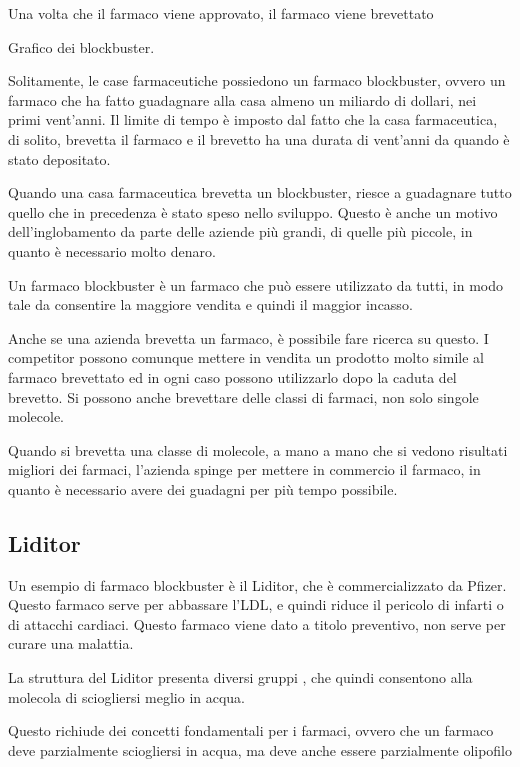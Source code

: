 Una volta che il farmaco viene approvato, il farmaco viene brevettato

Grafico dei blockbuster.

Solitamente, le case farmaceutiche possiedono un farmaco blockbuster,
ovvero un farmaco che ha fatto guadagnare alla casa almeno un miliardo
di dollari, nei primi vent'anni. Il limite di tempo è imposto dal fatto
che la casa farmaceutica, di solito, brevetta il farmaco e il brevetto
ha una durata di vent'anni da quando è stato depositato.

Quando una casa farmaceutica brevetta un blockbuster, riesce a
guadagnare tutto quello che in precedenza è stato speso nello sviluppo.
Questo è anche un motivo dell'inglobamento da parte delle aziende più
grandi, di quelle più piccole, in quanto è necessario molto denaro.

Un farmaco blockbuster è un farmaco che può essere utilizzato da tutti,
in modo tale da consentire la maggiore vendita e quindi il maggior
incasso.

Anche se una azienda brevetta un farmaco, è possibile fare ricerca su
questo. I competitor possono comunque mettere in vendita un prodotto
molto simile al farmaco brevettato ed in ogni caso possono utilizzarlo
dopo la caduta del brevetto. Si possono anche brevettare delle classi di
farmaci, non solo singole molecole.

Quando si brevetta una classe di molecole, a mano a mano che si vedono
risultati migliori dei farmaci, l'azienda spinge per mettere in
commercio il farmaco, in quanto è necessario avere dei guadagni per più
tempo possibile.

\subsection{Liditor}



Un esempio di farmaco blockbuster è il Liditor, che è commercializzato
da Pfizer. Questo farmaco serve per abbassare l'LDL, e quindi riduce il
pericolo di infarti o di attacchi cardiaci. Questo farmaco viene dato a
titolo preventivo, non serve per curare una malattia.

La struttura del Liditor presenta diversi gruppi , che quindi
consentono alla molecola di sciogliersi meglio in acqua.


Questo richiude dei concetti fondamentali per i farmaci, ovvero che un
farmaco deve parzialmente sciogliersi in acqua, ma deve anche essere
parzialmente olipofilo


